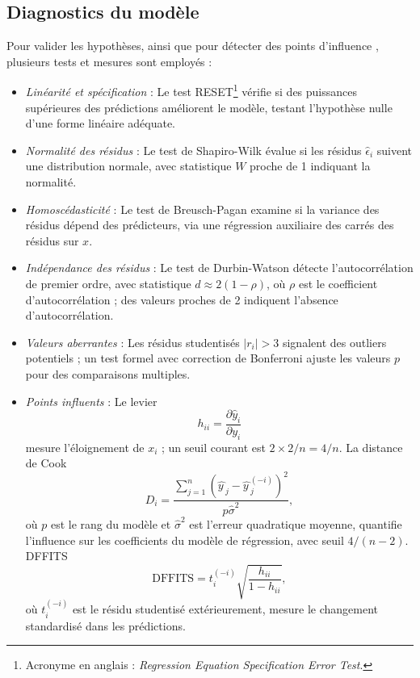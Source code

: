 \subsection{Diagnostics du modèle}
Pour valider les hypothèses, ainsi que pour détecter des points d'influence \citep{cook1982residuals}, plusieurs tests et mesures sont employés :
\begin{itemize}
	\item \emph{Linéarité et spécification} : Le test RESET\footnote{Acronyme en anglais : \emph{Regression Equation Specification Error Test}.} \citep{ramsey1969tests} vérifie si des puissances supérieures des prédictions améliorent le modèle, testant l'hypothèse nulle d'une forme linéaire adéquate.
	\item \emph{Normalité des résidus} : Le test de Shapiro-Wilk \citep{shapiro1965analysis} évalue si les résidus $\hat{\epsilon}_i$ suivent une distribution normale, avec statistique $W$ proche de 1 indiquant la normalité.
	\item \emph{Homoscédasticité} : Le test de Breusch-Pagan \citep{breusch1979simple} examine si la variance des résidus dépend des prédicteurs, via une régression auxiliaire des carrés des résidus sur $x$.
	\item \emph{Indépendance des résidus} : Le test de Durbin-Watson \citep{durbin1950testing} détecte l'autocorrélation de premier ordre, avec statistique $d \approx 2(1 - \rho)$, où $\rho$ est le coefficient d'autocorrélation ; des valeurs proches de 2 indiquent l'absence d'autocorrélation.
	\item \emph{Valeurs aberrantes} : Les résidus studentisés \citep{belsley1980regression} $|r_i| > 3$ signalent des outliers potentiels ; un test formel avec correction de Bonferroni ajuste les valeurs $p$ pour des comparaisons multiples.
	\item \emph{Points influents} : Le levier \citep{belsley1980regression}
	\begin{equation}
		h_{ii} = \frac{\partial\hat{y}_i}{\partial y_i}
	\end{equation}
	mesure l'éloignement de $x_i$ ; un seuil courant est $2 \times 2 / n = 4/n$. La distance de Cook
	\begin{equation}
		D_i = \frac { \sum_{j=1}^n \left( \widehat{y\,}_j - \widehat{y\,}_{j}^{(-i)} \right)^2 } {p \hat{\sigma}^2},
	\end{equation}
	où $p$ est le rang du modèle et $\hat{\sigma}^2$ est l'erreur quadratique moyenne,
	quantifie l'influence sur les coefficients du modèle de régression, avec seuil $4/(n-2)$. DFFITS \citep{belsley1980regression}
	\begin{equation}
		\text{DFFITS} = t_{i}^{(-i)} \sqrt{\frac{h_{ii}}{1-h_{ii}}},
	\end{equation}
	où $t_{i}^{(-i)}$ est le résidu studentisé extérieurement,
	mesure le changement standardisé dans les prédictions.
\end{itemize}

